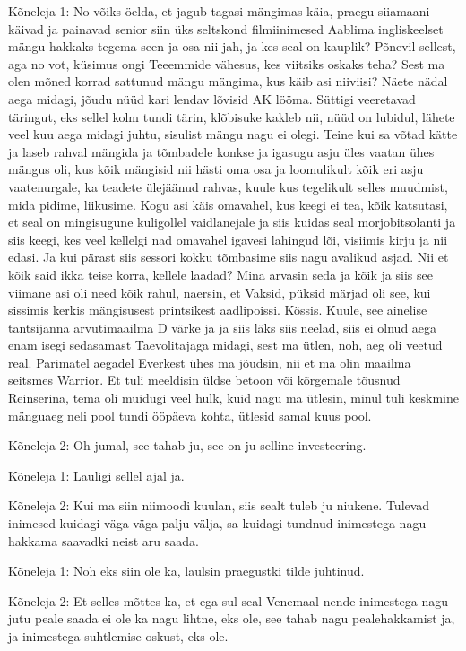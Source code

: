 Kõneleja 1:
No võiks öelda, et jagub tagasi mängimas käia, praegu siiamaani käivad ja painavad senior siin üks seltskond filmiinimesed Aablima ingliskeelset mängu hakkaks tegema seen ja osa nii jah, ja kes seal on kauplik? Põnevil sellest, aga no vot, küsimus ongi Teeemmide vähesus, kes viitsiks oskaks teha? Sest ma olen mõned korrad sattunud mängu mängima, kus käib asi niiviisi? Näete nädal aega midagi, jõudu nüüd kari lendav lõvisid AK lööma. Süttigi veeretavad täringut, eks sellel kolm tundi tärin, klõbisuke kakleb nii, nüüd on lubidul, lähete veel kuu aega midagi juhtu, sisulist mängu nagu ei olegi. Teine kui sa võtad kätte ja laseb rahval mängida ja tõmbadele konkse ja igasugu asju üles vaatan ühes mängus oli, kus kõik mängisid nii hästi oma osa ja loomulikult kõik eri asju vaatenurgale, ka teadete ülejäänud rahvas, kuule kus tegelikult selles muudmist, mida pidime, liikusime.
Kogu asi käis omavahel, kus keegi ei tea, kõik katsutasi, et seal on mingisugune kuligollel vaidlanejale ja siis kuidas seal morjobitsolanti ja siis keegi, kes veel kellelgi nad omavahel igavesi lahingud lõi, visiimis kirju ja nii edasi. Ja kui pärast siis sessori kokku tõmbasime siis nagu avalikud asjad. Nii et kõik said ikka teise korra, kellele laadad?
Mina arvasin seda ja kõik ja siis see viimane asi oli need kõik rahul, naersin, et Vaksid, püksid märjad oli see, kui sissimis kerkis mängisusest printsikest aadlipoissi. Kössis.
Kuule, see ainelise tantsijanna arvutimaailma
D värke ja ja siis läks siis neelad, siis ei olnud aega enam isegi sedasamast Taevolitajaga midagi, sest ma ütlen, noh, aeg oli veetud real. Parimatel aegadel Everkest ühes ma jõudsin, nii et ma olin maailma seitsmes Warrior.
Et tuli meeldisin üldse betoon või kõrgemale tõusnud Reinserina, tema oli muidugi veel hulk, kuid nagu ma ütlesin, minul tuli keskmine mänguaeg neli pool tundi ööpäeva kohta, ütlesid samal kuus pool.
                 
Kõneleja 2:
Oh jumal, see tahab ju, see on ju selline investeering.
                 
Kõneleja 1:
Lauligi sellel ajal ja.
                 
Kõneleja 2:
Kui ma siin niimoodi kuulan, siis sealt tuleb ju niukene.
Tulevad inimesed kuidagi väga-väga palju välja, sa kuidagi tundnud inimestega nagu hakkama saavadki neist aru saada.
                 
Kõneleja 1:
Noh eks siin ole ka, laulsin praegustki tilde juhtinud.
                 
Kõneleja 2:
Et selles mõttes ka, et ega sul seal Venemaal nende inimestega nagu jutu peale saada ei ole ka nagu lihtne, eks ole, see tahab nagu pealehakkamist ja, ja inimestega suhtlemise oskust, eks ole.
                 
